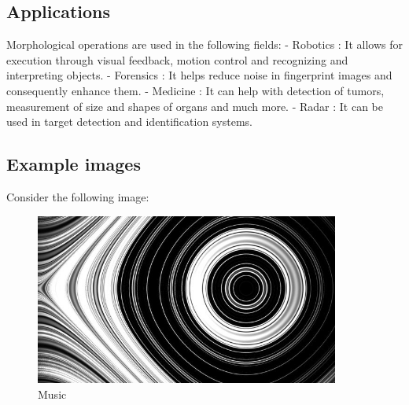 \documentclass[]{article}
\begin{document}
\subsection{Applications}\label{applications}

Morphological operations are used in the following fields: - Robotics :
It allows for execution through visual feedback, motion control and
recognizing and interpreting objects. - Forensics : It helps reduce
noise in fingerprint images and consequently enhance them. - Medicine :
It can help with detection of tumors, measurement of size and shapes of
organs and much more. - Radar : It can be used in target detection and
identification systems.

\subsection{Example images}\label{example-images}

Consider the following image: \\

\begin{figure}[htbp]
\begin{center}
\includegraphics[width = 10cm]{images/Morphological Operations/Images/music.jpg}
\caption{Music}
\end{center}
\end{figure}
\end{document}
